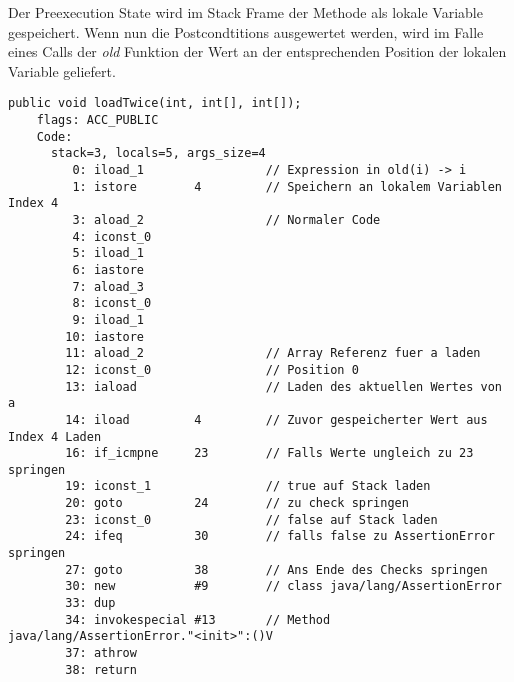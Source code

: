 Der Preexecution State wird im Stack Frame der Methode als lokale Variable gespeichert. Wenn nun 
die Postcondtitions ausgewertet werden, wird im Falle eines Calls der \textit{old} Funktion der Wert 
an der entsprechenden Position der lokalen Variable geliefert.
\newline
\begin{lstlisting}[caption=Bytecode der loadTwice Prozedur mit postcondition mit Zugriff auf old State. Damit der Code etwas Übersichtlicher ist\, wurde nur die erste Postcondtition kompiliert.,label={lst:loadtwice_code_old}]
public void loadTwice(int, int[], int[]);
    flags: ACC_PUBLIC
    Code:
      stack=3, locals=5, args_size=4
         0: iload_1                 // Expression in old(i) -> i 
         1: istore        4         // Speichern an lokalem Variablen Index 4
         3: aload_2                 // Normaler Code
         4: iconst_0      
         5: iload_1       
         6: iastore       
         7: aload_3       
         8: iconst_0      
         9: iload_1       
        10: iastore       
        11: aload_2                 // Array Referenz fuer a laden
        12: iconst_0                // Position 0
        13: iaload                  // Laden des aktuellen Wertes von a
        14: iload         4         // Zuvor gespeicherter Wert aus Index 4 Laden
        16: if_icmpne     23        // Falls Werte ungleich zu 23 springen
        19: iconst_1                // true auf Stack laden
        20: goto          24        // zu check springen
        23: iconst_0                // false auf Stack laden
        24: ifeq          30        // falls false zu AssertionError springen
        27: goto          38        // Ans Ende des Checks springen
        30: new           #9        // class java/lang/AssertionError
        33: dup           
        34: invokespecial #13       // Method java/lang/AssertionError."<init>":()V
        37: athrow        
        38: return
\end{lstlisting}


